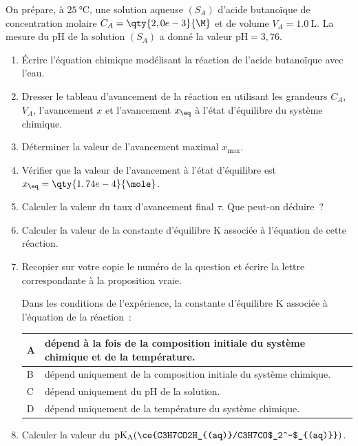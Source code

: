 On prépare, à $\qty{25}{\degreeCelsius}$, une solution aqueuse
$(S_{A})$ d'acide butanoïque de concentration molaire
$C_{A}=\qty{2,0e-3}{\M}$ et de volume $V_{A}=\qty{1,0}{\liter}$. La
mesure du $\mathrm{pH}$ de la solution $(S_{A})$ a donné la valeur
$\mathrm{pH}=3,76$.
\begin{enumerate}
    \item Écrire l'équation chimique modélisant la réaction de l'acide
          butanoïque avec l'eau.
    \item Dresser le tableau d'avancement de la réaction en utilisant
          les grandeurs $C_{A}$, $V_{A}$, l'avancement $x$ et
          l'avancement $x_{\eq}$ à l'état d'équilibre du système
          chimique.
    \item Déterminer la valeur de l'avancement maximal $x_{\max}$.
    \item Vérifier que la valeur de l'avancement à l'état d'équilibre
          est $x_{\eq}=\qty{1,74e-4}{\mole}$.
    \item Calculer la valeur du taux d'avancement final $\tau$. Que
          peut-on déduire~?
    \item Calculer la valeur de la constante d'équilibre $\mathrm{K}$
          associée à l'équation de cette réaction.
    \item Recopier sur votre copie le numéro de la question et écrire
          la lettre correspondante à la proposition vraie.

          Dans les conditions de l'expérience, la constante
          d'équilibre $\mathrm{K}$ associée à l'équation de la
          réaction~:
          \begin{minipage}{\linewidth}
              \begin{table}[H]
                  \centering
                  \setlength{\arrayrulewidth}{0.8pt}
                  \renewcommand{\arraystretch}{1.3}
                  \begin{tabularx}{\textwidth}{|
                        >{\arraybackslash\centering}p{7mm}|L|}
                      \hline 
                      A &  dépend à la fois de la composition initiale du
                            système chimique et de la température. \\
                      \hline 
                      B &  dépend uniquement de la composition initiale du
                            système chimique. \\
                      \hline 
                      C &  dépend uniquement du $\mathrm{pH}$ de la solution. \\
                      \hline 
                      D &  dépend uniquement de la température du système
                            chimique. \\
                      \hline 
                  \end{tabularx}
              \end{table}
          \end{minipage}
          
    \item Calculer la valeur du
          $\mathrm{pK_{A}}(\ce{C3H7CO2H_{(aq)}/C3H7CO$_2^-$_{(aq)}})$.
\end{enumerate}

